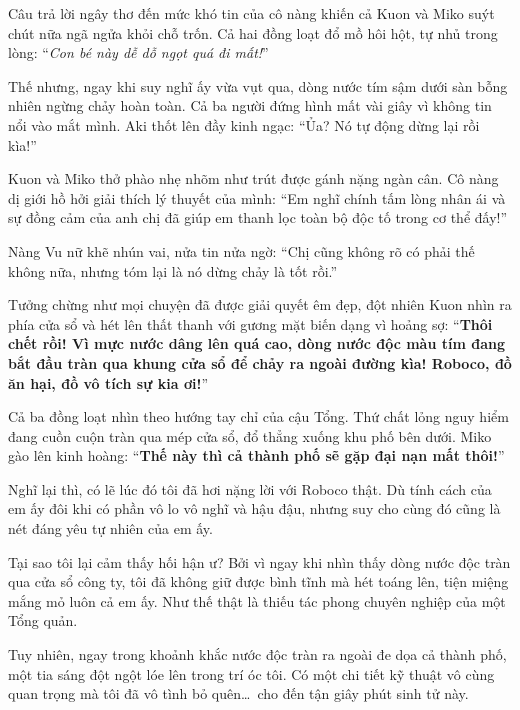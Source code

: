 \documentclass[../main.tex]{subfiles}
\begin{document}
Câu trả lời ngây thơ đến mức khó tin của cô nàng khiến cả Kuon và Miko suýt chút nữa ngã ngửa khỏi chỗ trốn. Cả hai đồng loạt đổ mồ hôi hột, tự nhủ trong lòng: ``\textit{Con bé này dễ dỗ ngọt quá đi mất!}''

Thế nhưng, ngay khi suy nghĩ ấy vừa vụt qua, dòng nước tím sậm dưới sàn bỗng nhiên ngừng chảy hoàn toàn. Cả ba người đứng hình mất vài giây vì không tin nổi vào mắt mình. Aki thốt lên đầy kinh ngạc:
``Ủa? Nó tự động dừng lại rồi kìa!''


Kuon và Miko thở phào nhẹ nhõm như trút được gánh nặng ngàn cân. Cô nàng dị giới hồ hởi giải thích lý thuyết của mình:
``Em nghĩ chính tấm lòng nhân ái và sự đồng cảm của anh chị đã giúp em thanh lọc toàn bộ độc tố trong cơ thể đấy!''

Nàng Vu nữ khẽ nhún vai, nửa tin nửa ngờ:
``Chị cũng không rõ có phải thế không nữa, nhưng tóm lại là nó dừng chảy là tốt rồi.''

Tưởng chừng như mọi chuyện đã được giải quyết êm đẹp, đột nhiên Kuon nhìn ra phía cửa sổ và hét lên thất thanh với gương mặt biến dạng vì hoảng sợ:
``\textbf{Thôi chết rồi! Vì mực nước dâng lên quá cao, dòng nước độc màu tím đang bắt đầu tràn qua khung cửa sổ để chảy ra ngoài đường kìa! Roboco, đồ ăn hại, đồ vô tích sự kia ơi!}''


Cả ba đồng loạt nhìn theo hướng tay chỉ của cậu Tổng. Thứ chất lỏng nguy hiểm đang cuồn cuộn tràn qua mép cửa sổ, đổ thẳng xuống khu phố bên dưới. Miko gào lên kinh hoàng:
``\textbf{Thế này thì cả thành phố sẽ gặp đại nạn mất thôi!}''

\omk


Nghĩ lại thì, có lẽ lúc đó tôi đã hơi nặng lời với Roboco thật. Dù tính cách của em ấy đôi khi có phần vô lo vô nghĩ và hậu đậu, nhưng suy cho cùng đó cũng là nét đáng yêu tự nhiên của em ấy.

Tại sao tôi lại cảm thấy hối hận ư? Bởi vì ngay khi nhìn thấy dòng nước độc tràn qua cửa sổ công ty, tôi đã không giữ được bình tĩnh mà hét toáng lên, tiện miệng mắng mỏ luôn cả em ấy. Như thế thật là thiếu tác phong chuyên nghiệp của một Tổng quản.

Tuy nhiên, ngay trong khoảnh khắc nước độc tràn ra ngoài đe dọa cả thành phố, một tia sáng đột ngột lóe lên trong trí óc tôi. Có một chi tiết kỹ thuật vô cùng quan trọng mà tôi đã vô tình bỏ quên\dots\ cho đến tận giây phút sinh tử này.
\end{document}
